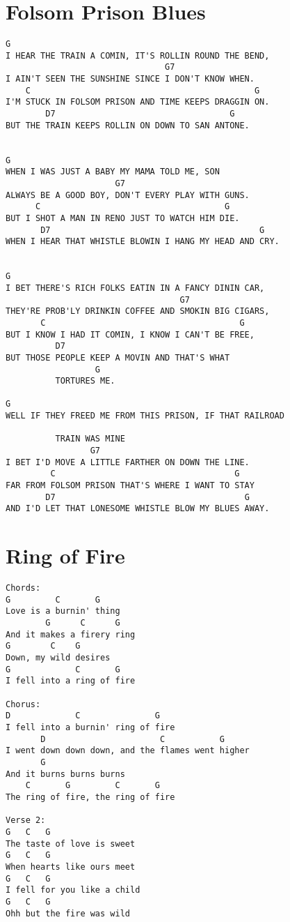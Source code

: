 \documentclass[leqno]{memoir}
\begin{document}
\chapter{Folsom Prison Blues}
\begin{verbatim}
G
I HEAR THE TRAIN A COMIN, IT'S ROLLIN ROUND THE BEND,
                                G7
I AIN'T SEEN THE SUNSHINE SINCE I DON'T KNOW WHEN.
    C                                             G
I'M STUCK IN FOLSOM PRISON AND TIME KEEPS DRAGGIN ON.
        D7                                   G
BUT THE TRAIN KEEPS ROLLIN ON DOWN TO SAN ANTONE.


G
WHEN I WAS JUST A BABY MY MAMA TOLD ME, SON
                      G7
ALWAYS BE A GOOD BOY, DON'T EVERY PLAY WITH GUNS.
      C                                     G
BUT I SHOT A MAN IN RENO JUST TO WATCH HIM DIE.
       D7                                          G
WHEN I HEAR THAT WHISTLE BLOWIN I HANG MY HEAD AND CRY.


G
I BET THERE'S RICH FOLKS EATIN IN A FANCY DININ CAR,
                                   G7
THEY'RE PROB'LY DRINKIN COFFEE AND SMOKIN BIG CIGARS,
       C                                       G
BUT I KNOW I HAD IT COMIN, I KNOW I CAN'T BE FREE, 
          D7
BUT THOSE PEOPLE KEEP A MOVIN AND THAT'S WHAT 
                  G
          TORTURES ME.

G
WELL IF THEY FREED ME FROM THIS PRISON, IF THAT RAILROAD

          TRAIN WAS MINE
                 G7
I BET I'D MOVE A LITTLE FARTHER ON DOWN THE LINE.
         C                                    G
FAR FROM FOLSOM PRISON THAT'S WHERE I WANT TO STAY
        D7                                      G
AND I'D LET THAT LONESOME WHISTLE BLOW MY BLUES AWAY.

\end{verbatim}
\newpage

\chapter{Ring of Fire}
\begin{verbatim}
Chords:
G         C       G
Love is a burnin' thing
        G      C      G
And it makes a firery ring
G        C    G
Down, my wild desires
G             C       G
I fell into a ring of fire

Chorus:
D             C               G
I fell into a burnin' ring of fire
       D                       C           G
I went down down down, and the flames went higher
       G
And it burns burns burns
    C       G         C       G
The ring of fire, the ring of fire

Verse 2:
G   C   G
The taste of love is sweet
G   C   G
When hearts like ours meet
G   C   G
I fell for you like a child 
G   C   G
Ohh but the fire was wild


\end{verbatim}
\newpage
\end{document}
